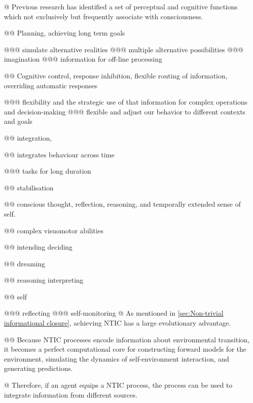 \documentclass[utf8]{article}
\begin{document}
		\begin{WritingMaterials}
		    @ Previous research has identified a set of perceptual and cognitive functions which not exclusively but frequently associate with consciousness. 
		    
    		    @@ Planning, achieving long term goals
    		    
    		        @@@ simulate alternative realities 
    		        @@@ multiple alternative possibilities
    		        @@@ imagination
    		        @@@ information for off-line processing
    		    
    		    @@ Cognitive control, response inhibition, flexible routing of information, overriding automatic responses
    		    
    		        @@@ flexibility and the strategic use of that information for complex operations and decision-making 
    		        @@@ flexible and adjust our behavior to different contexts and goals
    		    
    		    @@ integration,
    		    
    		    @@ integrates behaviour across time
    		    
    		        @@@ tasks for long duration
    		    
    		    @@ stabilisation
    		    
    		    @@ conscious thought, reflection, reasoning, and temporally extended sense of self. 
    		    
    		    @@ complex visuomotor abilities
    		    
    		    @@ intending deciding
    		    
    		    @@ dreaming
    		    
    		    @@ reasoning interpreting
    		    
    		    @@ self
    		    
    		        @@@ reflecting
    		        @@@ self-monitoring 
            @ As mentioned in \ref{sec:Non-trivial informational closure}, achieving NTIC has a large evolutionary advantage. 
            
                @@ Because NTIC processes encode information about environmental transition, it becomes a perfect computational core for constructing forward models for the environment, simulating the dynamics of self-environment interaction, and generating predictions. 
                
            @ Therefore, if an agent equips a NTIC process, the process can be used to integrate information from different sources. 
            

\end{WritingMaterials}
\end{document}
